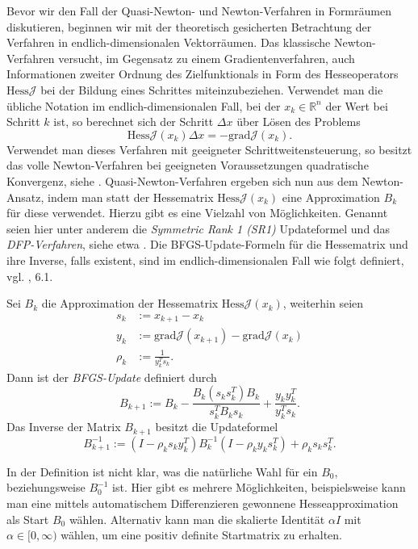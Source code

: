 Bevor wir den Fall der Quasi-Newton- und Newton-Verfahren in Formräumen diskutieren, beginnen wir mit der theoretisch gesicherten Betrachtung der Verfahren in endlich-dimensionalen Vektorräumen. Das klassische Newton-Verfahren versucht, im Gegensatz zu einem Gradientenverfahren, auch Informationen zweiter Ordnung des Zielfunktionals in Form des Hesseoperators $\text{Hess} \mathcal{J}$ bei der Bildung eines Schrittes miteinzubeziehen. Verwendet man die übliche Notation im endlich-dimensionalen Fall, bei der $x_k \in \mathbb{R}^n$ der Wert bei Schritt $k$ ist, so berechnet sich der Schritt $\Delta x$ über Lösen des Problems
\begin{equation}\label{newtonfinite}
	\text{Hess} \mathcal{J} (x_k)\Delta x = - \text{grad} \mathcal{J}(x_k).
\end{equation}
Verwendet man dieses Verfahren mit geeigneter Schrittweitensteuerung, so besitzt das volle Newton-Verfahren bei geeigneten Voraussetzungen quadratische Konvergenz, siehe \cite{Nocedal}. Quasi-Newton-Verfahren ergeben sich nun aus dem Newton-Ansatz, indem man statt der Hessematrix $\text{Hess}\mathcal{J}(x_k)$ eine Approximation $B_k$ für diese verwendet. Hierzu gibt es eine Vielzahl von Möglichkeiten. Genannt seien hier unter anderem die \textit{Symmetric Rank 1 (SR1)} Updateformel und das \textit{DFP-Verfahren}, siehe etwa \cite{Nocedal}. Die BFGS-Update-Formeln für die Hessematrix und ihre Inverse, falls existent, sind im endlich-dimensionalen Fall wie folgt definiert, vgl. \cite{Nocedal}, 6.1.

\begin{defi}\label{BFGS-updates}	
	Sei $B_k$ die Approximation der Hessematrix $\text{Hess}\mathcal{J}(x_k)$, weiterhin seien 
	\begin{align*}
		s_k &:= x_{k+1} - x_k \\ y_k &:= \text{grad} \mathcal{J}(x_{k+1}) - \text{grad} \mathcal{J}(x_k) \\ \rho_k &:= \frac{1}{y_k^T s_k }.
	\end{align*}
	Dann ist der \textit{BFGS-Update} definiert durch
	\begin{equation}
		B_{k+1} := B_k - \frac{B_k (s_k s_k^T) B_k}{s_k^T B_k s_k} + \frac{y_k y_k^T}{y_k^T s_k}.
	\end{equation}
	Das Inverse der Matrix $B_{k+1}$ besitzt die Updateformel
	\begin{equation}
		B_{k+1}^{-1} := (I - \rho_k s_k y_k^T)B_k^{-1}(I - \rho_k y_k s_k^T) + \rho_k s_k s_k^T.
	\end{equation}
\end{defi}
In der Definition ist nicht klar, was die natürliche Wahl für ein $B_0$, beziehungsweise $B_0^{-1}$ ist. Hier gibt es mehrere Möglichkeiten, beispielsweise kann man eine mittels automatischem Differenzieren gewonnene Hesseapproximation als Start $B_0$ wählen. Alternativ kann man die skalierte Identität $\alpha I$ mit $\alpha \in [0,\infty)$ wählen, um eine positiv definite Startmatrix zu erhalten.

